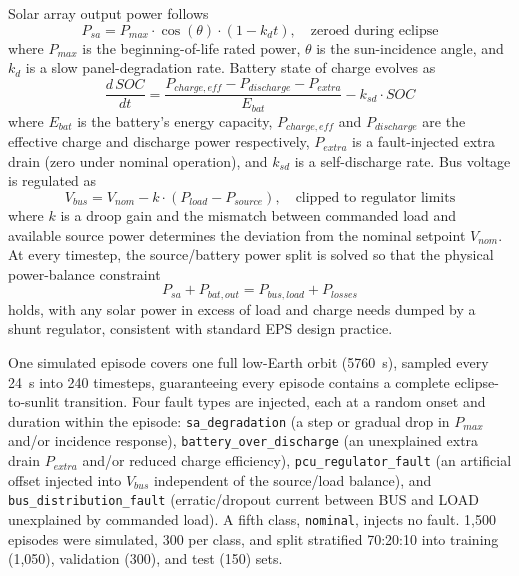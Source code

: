 \documentclass[conference]{IEEEtran}
\begin{document}
Solar array output power follows
\begin{equation}
P_{sa} = P_{max} \cdot \cos(\theta) \cdot (1 - k_d t), \quad \text{zeroed during eclipse}
\label{eq:solar}
\end{equation}
where $P_{max}$ is the beginning-of-life rated power, $\theta$ is the sun-incidence angle, and
$k_d$ is a slow panel-degradation rate. Battery state of charge evolves as
\begin{equation}
\frac{d\,SOC}{dt} = \frac{P_{charge,eff} - P_{discharge} - P_{extra}}{E_{bat}} - k_{sd} \cdot SOC
\label{eq:soc}
\end{equation}
where $E_{bat}$ is the battery's energy capacity, $P_{charge,eff}$ and $P_{discharge}$ are the
effective charge and discharge power respectively, $P_{extra}$ is a fault-injected extra drain
(zero under nominal operation), and $k_{sd}$ is a self-discharge rate. Bus voltage is
regulated as
\begin{equation}
V_{bus} = V_{nom} - k\cdot(P_{load} - P_{source}), \quad \text{clipped to regulator limits}
\label{eq:vbus}
\end{equation}
where $k$ is a droop gain and the mismatch between commanded load and available source power
determines the deviation from the nominal setpoint $V_{nom}$. At every timestep, the
source/battery power split is solved so that the physical power-balance constraint
\begin{equation}
P_{sa} + P_{bat,out} = P_{bus,load} + P_{losses}
\label{eq:balance}
\end{equation}
holds, with any solar power in excess of load and charge needs dumped by a shunt regulator,
consistent with standard EPS design practice.

One simulated episode covers one full low-Earth orbit (5760~s), sampled every 24~s into 240
timesteps, guaranteeing every episode contains a complete eclipse-to-sunlit transition. Four
fault types are injected, each at a random onset and duration within the episode:
\texttt{sa\_degradation} (a step or gradual drop in $P_{max}$ and/or incidence response),
\texttt{battery\_over\_discharge} (an unexplained extra drain $P_{extra}$ and/or reduced
charge efficiency), \texttt{pcu\_regulator\_fault} (an artificial offset injected into
$V_{bus}$ independent of the source/load balance), and \texttt{bus\_distribution\_fault}
(erratic/dropout current between BUS and LOAD unexplained by commanded load). A fifth class,
\texttt{nominal}, injects no fault. 1,500 episodes were simulated, 300 per class, and split
stratified 70:20:10 into training (1,050), validation (300), and test (150) sets.
\end{document}
